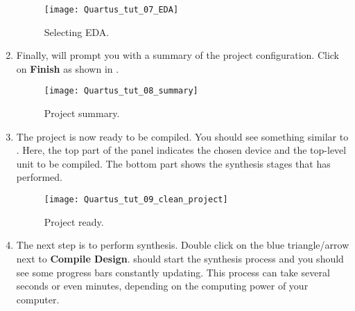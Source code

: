 \documentclass[number=01]{assignment}
\begin{document}
\begin{enumerate}
    \begin{figure}[!hptb]
      \centering
      \texttt{[image: Quartus\_tut\_07\_EDA]}
      \caption{Selecting EDA.}
      \label{Figure:Quartus_EDA}
    \end{figure}
\newpage
\item Finally, \Quartus will prompt you with a summary of the project configuration. Click on \textbf{Finish} as shown in .    
    \begin{figure}[!hptb]
      \centering
      \texttt{[image: Quartus\_tut\_08\_summary]}
      \caption{Project summary.}
      \label{Figure:Quartus_summary}
    \end{figure}
\newpage
\item The project is now ready to be compiled. You should see something similar to . 
Here, the top part of the panel indicates the chosen device and the top-level unit to be compiled.
The bottom part shows the synthesis stages that \Quartus has performed.    
    \begin{figure}[!hptb]
      \centering
      \texttt{[image: Quartus\_tut\_09\_clean\_project]}
      \caption{Project ready.}
      \label{Figure:Quartus_clean_project}
    \end{figure}
\newpage
\item The next step is to perform synthesis. Double click on the blue triangle/arrow next to \textbf{Compile Design}.
\Quartus should start the synthesis process and you should see some progress bars constantly updating.
This process can take several seconds or even minutes, depending on the computing power of your computer.    


\end{enumerate}
\end{document}
